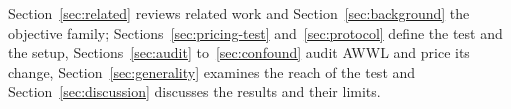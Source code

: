 Section~\ref{sec:related} reviews related work and
Section~\ref{sec:background} the objective family;
Sections~\ref{sec:pricing-test} and~\ref{sec:protocol} define the test and
the setup, Sections~\ref{sec:audit} to~\ref{sec:confound} audit AWWL and
price its change, Section~\ref{sec:generality} examines the reach of the test
and Section~\ref{sec:discussion} discusses the results and their limits.
